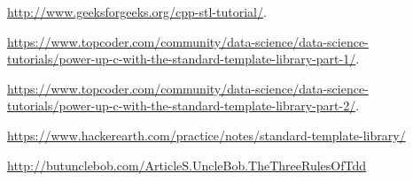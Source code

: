 \begin{thebibliography}{9}

\href{http://www.geeksforgeeks.org/cpp-stl-tutorial/}{http://www.geeksforgeeks.org/cpp-stl-tutorial/}.

\href{https://www.topcoder.com/community/data-science/data-science-tutorials/power-up-c-with-the-standard-template-library-part-1/}{https://www.topcoder.com/community/data-science/data-science-tutorials/power-up-c-with-the-standard-template-library-part-1/}.

\href{https://www.topcoder.com/community/data-science/data-science-tutorials/power-up-c-with-the-standard-template-library-part-1/}{https://www.topcoder.com/community/data-science/data-science-tutorials/power-up-c-with-the-standard-template-library-part-2/}.

\href{https://www.hackerearth.com/practice/notes/standard-template-library/}{https://www.hackerearth.com/practice/notes/standard-template-library/}

\href{http://butunclebob.com/ArticleS.UncleBob.TheThreeRulesOfTdd}{http://butunclebob.com/ArticleS.UncleBob.TheThreeRulesOfTdd}



\end{thebibliography}

